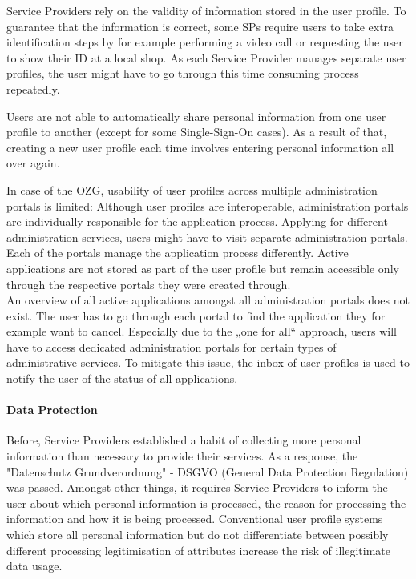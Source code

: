 Service Providers rely on the validity of information stored in the user profile. To guarantee that the information is correct, some SPs require users to take extra identification steps by for example performing a video call or requesting the user to show their ID at a local shop. As each Service Provider manages separate user profiles, the user might have to go through this time consuming process repeatedly.

Users are not able to automatically share personal information from one user profile to another (except for some Single-Sign-On cases). As a result of that, creating a new user profile each time involves entering personal information all over again. 


In case of the OZG, usability of user profiles across multiple administration portals is limited: Although user profiles are interoperable, administration portals are individually responsible for the application process. Applying for different administration services, users might have to visit separate administration portals. Each of the portals manage the application process differently. Active applications are not stored as part of the user profile but remain accessible only through the respective portals they were created through.\\ An overview of all active applications amongst all administration portals does not exist. The user has to go through each portal to find the application they for example want to cancel. Especially due to the „one for all“ approach, users will have to access dedicated administration portals for certain types of administrative services. To mitigate this issue, the inbox of user profiles is used to notify the user of the status of all applications.

\paragraph{Data Protection}
Before, Service Providers established a habit of collecting more personal information than necessary to provide their services. As a response, the "Datenschutz Grundverordnung" - DSGVO (General Data Protection Regulation) was passed. Amongst other things, it requires Service Providers to inform the user about which personal information is processed, the reason for processing the information and how it is being processed. Conventional user profile systems which store all personal information but do not differentiate between possibly different processing legitimisation of attributes increase the risk of illegitimate data usage.


